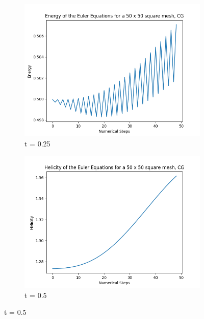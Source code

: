 \begin{figure}[!ht]
  \centering
  \begin{subfigure}[b]{0.475\textwidth}
      \centering
      \includegraphics[width=\textwidth]{./img/energy}
      \caption[Network2]%
      {{\small t = 0.25}}
      \label{fig:energy}
  \end{subfigure}
  \hfill
  \begin{subfigure}[b]{0.475\textwidth}
      \centering
      \includegraphics[width=\textwidth]{./img/helicity}
      \caption[]%
      {{\small t = 0.5}}
      \label{fig:helcity}
  \end{subfigure}
  \label{fig:conserv}
\end{figure}

